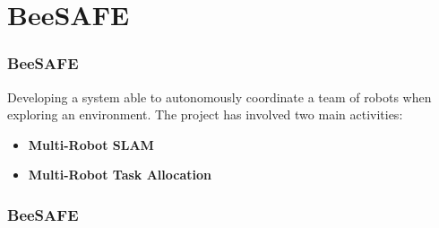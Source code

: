 \section{BeeSAFE}

\begin{frame}
	\frametitle{BeeSAFE}
	
	\Large
	Developing a system able to autonomously coordinate a team of robots when exploring an
	environment. The project has involved two main activities:
	
	\vspace{0.4cm}
	
	\begin{itemize}
		\item \textbf{Multi-Robot SLAM}
		\item \textbf{Multi-Robot Task Allocation}
	\end{itemize}
\end{frame}

\begin{frame}
	\frametitle{BeeSAFE}
	
	\begin{center}
	\end{center}
\end{frame}

